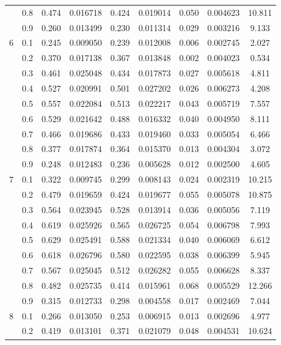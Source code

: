 \begin{longtable}{ | c | c || c | c | c | c | c | c | c | }
 & 0.8 & 0.474 & 0.016718 & 0.424 & 0.019014 & 0.050 & 0.004623 & 10.811 \\
 & 0.9 & 0.260 & 0.013499 & 0.230 & 0.011314 & 0.029 & 0.003216 & 9.133 \\
 \hline
\multirow{9}{*}{6} & 0.1 & 0.245 & 0.009050 & 0.239 & 0.012008 & 0.006 & 0.002745 & 2.027 \\
 & 0.2 & 0.370 & 0.017138 & 0.367 & 0.013848 & 0.002 & 0.004023 & 0.534 \\
 & 0.3 & 0.461 & 0.025048 & 0.434 & 0.017873 & 0.027 & 0.005618 & 4.811 \\
 & 0.4 & 0.527 & 0.020991 & 0.501 & 0.027202 & 0.026 & 0.006273 & 4.208 \\
 & 0.5 & 0.557 & 0.022084 & 0.513 & 0.022217 & 0.043 & 0.005719 & 7.557 \\
 & 0.6 & 0.529 & 0.021642 & 0.488 & 0.016332 & 0.040 & 0.004950 & 8.111 \\
 & 0.7 & 0.466 & 0.019686 & 0.433 & 0.019460 & 0.033 & 0.005054 & 6.466 \\
 & 0.8 & 0.377 & 0.017874 & 0.364 & 0.015370 & 0.013 & 0.004304 & 3.072 \\
 & 0.9 & 0.248 & 0.012483 & 0.236 & 0.005628 & 0.012 & 0.002500 & 4.605 \\
 \hline
\multirow{9}{*}{7} & 0.1 & 0.322 & 0.009745 & 0.299 & 0.008143 & 0.024 & 0.002319 & 10.215 \\
 & 0.2 & 0.479 & 0.019659 & 0.424 & 0.019677 & 0.055 & 0.005078 & 10.875 \\
 & 0.3 & 0.564 & 0.023945 & 0.528 & 0.013914 & 0.036 & 0.005056 & 7.119 \\
 & 0.4 & 0.619 & 0.025926 & 0.565 & 0.026725 & 0.054 & 0.006798 & 7.993 \\
 & 0.5 & 0.629 & 0.025491 & 0.588 & 0.021334 & 0.040 & 0.006069 & 6.612 \\
 & 0.6 & 0.618 & 0.026796 & 0.580 & 0.022595 & 0.038 & 0.006399 & 5.945 \\
 & 0.7 & 0.567 & 0.025045 & 0.512 & 0.026282 & 0.055 & 0.006628 & 8.337 \\
 & 0.8 & 0.482 & 0.025735 & 0.414 & 0.015961 & 0.068 & 0.005529 & 12.266 \\
 & 0.9 & 0.315 & 0.012733 & 0.298 & 0.004558 & 0.017 & 0.002469 & 7.044 \\
 \hline
\multirow{9}{*}{8} & 0.1 & 0.266 & 0.013050 & 0.253 & 0.006915 & 0.013 & 0.002696 & 4.977 \\
 & 0.2 & 0.419 & 0.013101 & 0.371 & 0.021079 & 0.048 & 0.004531 & 10.624 \\

\end{longtable}
